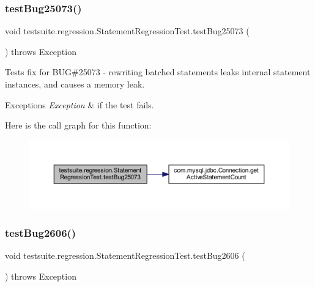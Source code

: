 \subsubsection{\texorpdfstring{test\+Bug25073()}{testBug25073()}}
{\footnotesize\ttfamily void testsuite.\+regression.\+Statement\+Regression\+Test.\+test\+Bug25073 (\begin{DoxyParamCaption}{ }\end{DoxyParamCaption}) throws Exception}

Tests fix for B\+UG\#25073 -\/ rewriting batched statements leaks internal statement instances, and causes a memory leak.


\begin{DoxyExceptions}{Exceptions}
{\em Exception} & if the test fails. \\
\hline
\end{DoxyExceptions}
Here is the call graph for this function\+:
\nopagebreak
\begin{figure}[H]
\begin{center}
\leavevmode
\includegraphics[width=350pt]{classtestsuite_1_1regression_1_1_statement_regression_test_a67cdc2b43a1d7ac490ee30dd639ebd48_cgraph}
\end{center}
\end{figure}
\mbox{\label{classtestsuite_1_1regression_1_1_statement_regression_test_aa53278612006c285096de5d15c6e17aa}} 
\subsubsection{\texorpdfstring{test\+Bug2606()}{testBug2606()}}
{\footnotesize\ttfamily void testsuite.\+regression.\+Statement\+Regression\+Test.\+test\+Bug2606 (\begin{DoxyParamCaption}{ }\end{DoxyParamCaption}) throws Exception}

